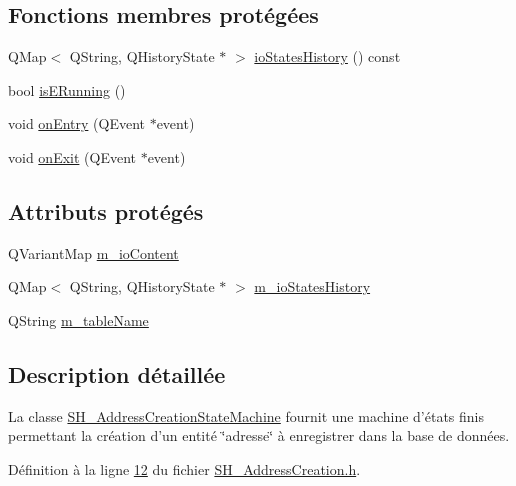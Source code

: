 \subsection*{Fonctions membres protégées}
\begin{DoxyCompactItemize}
\item 
Q\-Map$<$ Q\-String, Q\-History\-State $\ast$ $>$ \hyperlink{classSimpleHotel_1_1SH__InOutStateMachine_a0f59a90204a7cbb6835da28cd234978f}{io\-States\-History} () const 
\item 
bool \hyperlink{classSimpleHotel_1_1SH__InOutStateMachine_a6ca4ef874eaaf2446c1a65e6bcbfc46b}{is\-E\-Running} ()
\item 
void \hyperlink{classSimpleHotel_1_1SH__GenericStateMachine_a42c47602883a70ef4965cff373cd5ab6}{on\-Entry} (Q\-Event $\ast$event)
\item 
void \hyperlink{classSimpleHotel_1_1SH__GenericStateMachine_adecc9814338e400f9fce1cc637f1e081}{on\-Exit} (Q\-Event $\ast$event)
\end{DoxyCompactItemize}
\subsection*{Attributs protégés}
\begin{DoxyCompactItemize}
\item 
Q\-Variant\-Map \hyperlink{classSimpleHotel_1_1SH__InOutStateMachine_a4b0a3a48b0da31fddb724a357ad9b52c}{m\-\_\-io\-Content}
\item 
Q\-Map$<$ Q\-String, Q\-History\-State $\ast$ $>$ \hyperlink{classSimpleHotel_1_1SH__InOutStateMachine_a45a7defb15e50a196bc471017fc86eb4}{m\-\_\-io\-States\-History}
\item 
Q\-String \hyperlink{classSimpleHotel_1_1SH__InOutStateMachine_a15c063debdaa4c87bd4925867a13ce9e}{m\-\_\-table\-Name}
\end{DoxyCompactItemize}


\subsection{Description détaillée}
La classe \hyperlink{classSimpleHotel_1_1SH__AddressCreationStateMachine}{S\-H\-\_\-\-Address\-Creation\-State\-Machine} fournit une machine d'états finis permettant la création d'un entité \char`\"{}adresse\char`\"{} à enregistrer dans la base de données. 

Définition à la ligne \hyperlink{SH__AddressCreation_8h_source_l00012}{12} du fichier \hyperlink{SH__AddressCreation_8h_source}{S\-H\-\_\-\-Address\-Creation.\-h}.



